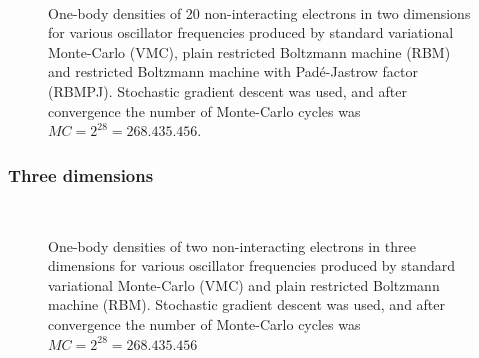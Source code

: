 \begin{figure} [H]%
	\centering
	\\
	
	\caption{One-body densities of 20 non-interacting electrons in two dimensions for various oscillator frequencies produced by standard variational Monte-Carlo (VMC), plain restricted Boltzmann machine (RBM) and restricted Boltzmann machine with Padé-Jastrow factor (RBMPJ). Stochastic gradient descent was used, and after convergence the number of Monte-Carlo cycles was $MC=2^{28}=268.435.456$.}%
	\label{fig:OB_interaction_20P_2D}
\end{figure}

\subsubsection{Three dimensions}
\begin{figure} [H]%
	\centering
	\\
	
	\caption{One-body densities of two non-interacting electrons in three dimensions for various oscillator frequencies produced by standard variational Monte-Carlo (VMC) and plain restricted Boltzmann machine (RBM). Stochastic gradient descent was used, and after convergence the number of Monte-Carlo cycles was $MC=2^{28}=268.435.456$}%
	\label{fig:OB_interaction_2P_3D}
\end{figure}

